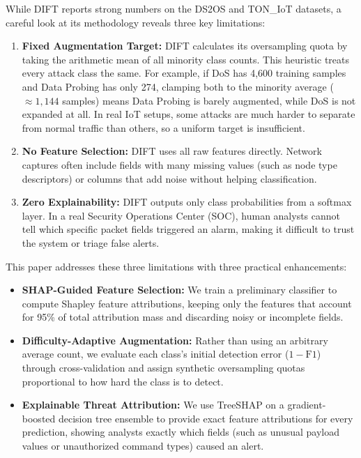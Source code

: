 While DIFT reports strong numbers on the DS2OS and TON\_IoT datasets, a careful look at its methodology reveals three key limitations:
\begin{enumerate}
    \item \textbf{Fixed Augmentation Target:} DIFT calculates its oversampling quota by taking the arithmetic mean of all minority class counts. This heuristic treats every attack class the same. For example, if DoS has 4,600 training samples and Data Probing has only 274, clamping both to the minority average ($\approx 1,144$ samples) means Data Probing is barely augmented, while DoS is not expanded at all. In real IoT setups, some attacks are much harder to separate from normal traffic than others, so a uniform target is insufficient.
    \item \textbf{No Feature Selection:} DIFT uses all raw features directly. Network captures often include fields with many missing values (such as node type descriptors) or columns that add noise without helping classification.
    \item \textbf{Zero Explainability:} DIFT outputs only class probabilities from a softmax layer. In a real Security Operations Center (SOC), human analysts cannot tell which specific packet fields triggered an alarm, making it difficult to trust the system or triage false alerts.
\end{enumerate}

This paper addresses these three limitations with three practical enhancements:
\begin{itemize}
    \item \textbf{SHAP-Guided Feature Selection:} We train a preliminary classifier to compute Shapley feature attributions, keeping only the features that account for 95\% of total attribution mass and discarding noisy or incomplete fields.
    \item \textbf{Difficulty-Adaptive Augmentation:} Rather than using an arbitrary average count, we evaluate each class's initial detection error ($1 - \text{F1}$) through cross-validation and assign synthetic oversampling quotas proportional to how hard the class is to detect.
    \item \textbf{Explainable Threat Attribution:} We use TreeSHAP on a gradient-boosted decision tree ensemble to provide exact feature attributions for every prediction, showing analysts exactly which fields (such as unusual payload values or unauthorized command types) caused an alert.
\end{itemize}

